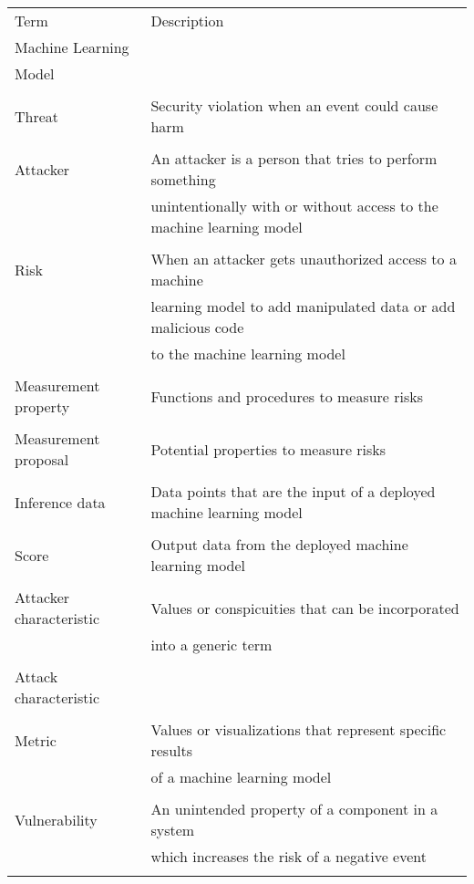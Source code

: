 \begin{center}
  \begin{tabular}{ |l|l|  }
    \hline
    \rowcolor{lightgray} Term & Description \\ [0.5ex]
    Machine Learning & \cite{google}\\
    Model & \\
    & \\
    \hline
    Threat & Security violation when an event could cause harm \cite{shirey2007internet} \\
    & \\
    \hline
    Attacker & An attacker is a person that tries to perform something \\
    & unintentionally with or without access to the machine learning model \cite{bsi_glossar_2021}\\
    & \\
    \hline
    Risk & When an attacker gets unauthorized access to a machine  \\
    & learning model to add manipulated data or add malicious code \\
    & to the machine learning model \\
    & \\
    \hline
    Measurement property & Functions and procedures to measure risks \\
    & \\
    \hline
    Measurement proposal & Potential properties to measure risks \\
    & \\
    \hline
    Inference data & Data points that are the input of a deployed machine learning model \\
    & \\
    \hline
    Score & Output data from the deployed machine learning model \\
    & \\
    \hline
    Attacker characteristic & Values or conspicuities that can be incorporated \\
    & into a generic term \\
    & \\
    \hline
    Attack characteristic & \\
    & \\
    \hline
    Metric & Values or visualizations that represent specific results \\
    & of a machine learning model \\
    & \\
    \hline
    Vulnerability & An unintended property of a component in a system \\
    & which increases the risk of a negative event \\
    & \\
    \hline
  \end{tabular}
\end{center}
